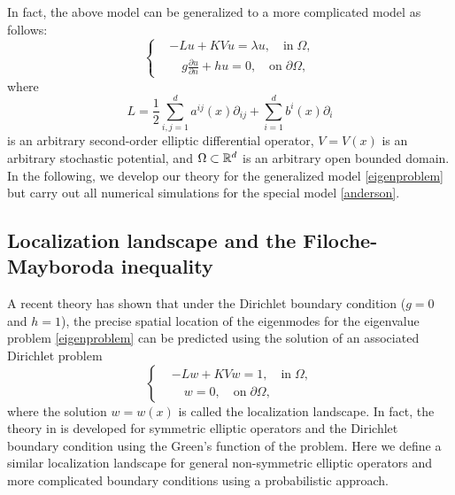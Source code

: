 \documentclass[a4paper,11pt]{article}
\begin{document}
In fact, the above model can be generalized to a more complicated model as follows:
\begin{equation}\label{eigenproblem}
\left\{
\begin{split}
& - L u + K V u = \lambda u, \quad\textrm{in}\;\Omega, \\
& \quad g \frac{\partial u}{\partial n} + h u = 0, \quad \textrm{on} \; \partial \Omega,
\end{split}
\right.
\end{equation}
where
\begin{equation*}
L = \frac{1}{2} \sum_{i,j=1}^{d} a^{ij}(x) \partial_{ij} + \sum_{i=1}^{d} b^i(x) \partial_i
\end{equation*}
is an arbitrary second-order elliptic differential operator, $V = V(x)$ is an arbitrary stochastic potential, and $\Omega \subset \mathbb{R}^d$ is an arbitrary open bounded domain. In the following, we develop our theory for the generalized model \eqref{eigenproblem} but carry out all numerical simulations for the special model \eqref{anderson}.

\subsection{Localization landscape and the Filoche-Mayboroda inequality}

A recent theory \cite{filoche2012universal} has shown that under the Dirichlet boundary condition ($g = 0$ and $h = 1$), the precise spatial location of the eigenmodes for the eigenvalue problem \eqref{eigenproblem} can be predicted using the solution of an associated Dirichlet problem
\begin{equation}\label{landDirichlet}
\left\{
\begin{split}
& -L w + K V w = 1, \quad \textrm{in} \; \Omega, \\
& \quad w = 0, \quad \textrm{on} \; \partial \Omega,
\end{split}
\right.
\end{equation}
where the solution $w = w(x)$ is called the localization landscape. In fact, the theory in \cite{filoche2012universal} is developed for symmetric elliptic operators and the Dirichlet boundary condition using the Green's function of the problem. Here we define a similar localization landscape for general non-symmetric elliptic operators and more complicated boundary conditions using a probabilistic approach.
\end{document}
